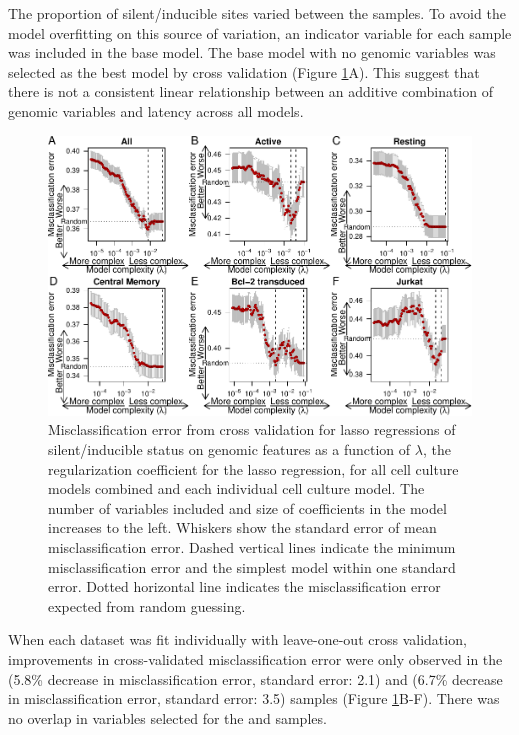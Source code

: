\documentclass[../sherrill-Mix_thesis.tex]{subfiles}
\begin{document}
		The proportion of silent/inducible sites varied between the samples. To avoid the model overfitting on this source of variation, an indicator variable for each sample was included in the base model. The base model with no genomic variables was selected as the best model by cross validation (Figure \ref{indivFit}A). This suggest that there is not a consistent linear relationship between an additive combination of genomic variables and latency across all models.

		\begin{figure}
			\centering
				\includegraphics[width=1\textwidth]{individualFits.pdf} %
			\caption[Lasso regressions predicting latency]{Misclassification error from cross validation for lasso regressions of silent/inducible status on genomic features as a function of $\lambda$, the regularization coefficient for the lasso regression, for all cell culture models combined and each individual cell culture model. The number of variables included and size of coefficients in the model increases to the left. Whiskers show the standard error of mean misclassification error. Dashed vertical lines indicate the minimum misclassification error and the simplest model within one standard error. Dotted horizontal line indicates the misclassification error expected from random guessing.}
			\label{indivFit}
		\end{figure}


		When each dataset was fit individually with leave-one-out cross validation, improvements in cross-validated misclassification error were only observed in the \Active{} (5.8\% decrease in misclassification error, standard error: 2.1) and \Jurkat{} (6.7\% decrease in misclassification error, standard error: 3.5) samples (Figure \ref{indivFit}B-F). There was no overlap in variables selected for the \Active{} and \Jurkat{} samples. %
\end{document}
